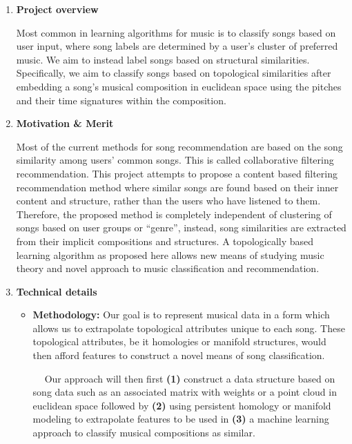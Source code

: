 \documentclass[11pt, a4paper]{article}
\begin{document}
%
%
\noindent{}



\fi
\begin{enumerate}
  
\item \textbf{  Project overview}
  
  Most common in learning algorithms for music is to classify songs based on user input, where song labels are determined by a user's cluster of preferred music. We aim to instead label songs based on structural similarities. Specifically, we aim to classify songs based on topological similarities after embedding a song's musical composition in euclidean space using the pitches and their time signatures within the composition.

\item \textbf{Motivation \& Merit}

  Most of the current methods for song recommendation are based on the song similarity among users' common songs. This is called collaborative filtering recommendation. This project attempts to propose a content based filtering recommendation method where similar songs are found based on their inner content and structure, rather than the users who have listened to them. Therefore, the proposed method is completely independent of clustering of songs based on user groups or ``genre'', instead, song similarities are extracted from their implicit compositions and structures. A topologically based learning algorithm as proposed here allows new means of studying music theory and novel approach to music classification and recommendation. 

  \item \textbf{Technical details}
    \begin{itemize}
    \item \textbf{Methodology:}
      Our goal is to represent musical data in a form which allows us to extrapolate topological attributes unique to each song. These topological attributes, be it homologies or manifold structures, would then afford features to construct a novel means of song classification. 
      
      $\ \ \ \ $ Our approach will then first \textbf{(1)} construct a data structure based on song data such as an associated matrix with weights or a point cloud in euclidean space followed by \textbf{(2)} using persistent homology or manifold modeling to extrapolate features to be used in \textbf{(3)} a machine learning approach to classify musical compositions as similar.


\end{itemize}
\end{enumerate}
\end{document}
